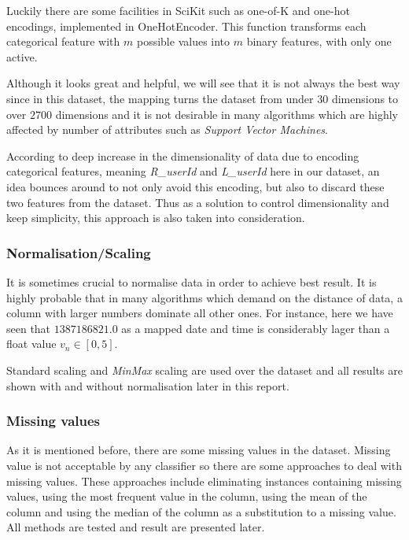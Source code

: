 Luckily there are some facilities in
SciKit such as one-of-K and one-hot encodings, implemented in OneHotEncoder. 
This function transforms each categorical
   feature with $m$ possible values into $m$ binary features, with only one
   active.

Although it looks great and helpful, we will see that it is not always the best
way since in this dataset, the mapping turns the dataset from under $30$
dimensions to over $2700$ dimensions and it is not desirable in many algorithms
which are highly affected by number of attributes such as {\it Support Vector
Machines}.

According to deep increase in the dimensionality of data due to encoding
categorical features, meaning {\it R\_userId} and {\it L\_userId} here in our
dataset, an idea bounces around to not only avoid this encoding, but also to
discard these two features from the dataset. Thus as a solution to control
dimensionality and keep simplicity, this approach is also taken into
consideration.

\subsubsection{Normalisation/Scaling}

It is sometimes crucial to normalise data in order to achieve best result. It is
highly probable that in many algorithms which demand on the distance of data, a
column with larger numbers dominate all other ones. For instance, here we have
seen that $1387186821.0$ as a mapped date and time is considerably lager than a
float value $v_n \in [0,5]$.

Standard scaling and {\it MinMax} scaling are used over the dataset and all
results are shown with and without normalisation later in this report.

\subsubsection{Missing values}

As it is mentioned before, there are some missing values in the dataset. Missing
value is not acceptable by any classifier so there are some approaches to deal
with missing values. These approaches include eliminating instances containing
missing values, using the most frequent value in the column, using the mean of
the column and using the median of the column as a substitution to a missing
value. All methods are tested and result are presented later.

